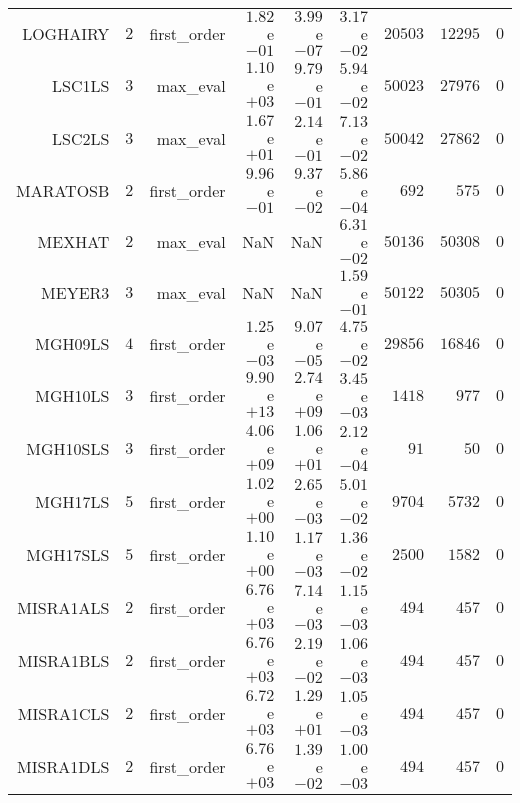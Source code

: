 \begin{longtable}{rrrrrrrrr}
LOGHAIRY & \(     2\) & first\_order & \( 1.82\)e\(-01\) & \( 3.99\)e\(-07\) & \( 3.17\)e\(-02\) & \( 20503\) & \( 12295\) & \(     0\) \\
LSC1LS & \(     3\) & max\_eval & \( 1.10\)e\(+03\) & \( 9.79\)e\(-01\) & \( 5.94\)e\(-02\) & \( 50023\) & \( 27976\) & \(     0\) \\
LSC2LS & \(     3\) & max\_eval & \( 1.67\)e\(+01\) & \( 2.14\)e\(-01\) & \( 7.13\)e\(-02\) & \( 50042\) & \( 27862\) & \(     0\) \\
MARATOSB & \(     2\) & first\_order & \( 9.96\)e\(-01\) & \( 9.37\)e\(-02\) & \( 5.86\)e\(-04\) & \(   692\) & \(   575\) & \(     0\) \\
MEXHAT & \(     2\) & max\_eval &       NaN &       NaN & \( 6.31\)e\(-02\) & \( 50136\) & \( 50308\) & \(     0\) \\
MEYER3 & \(     3\) & max\_eval &       NaN &       NaN & \( 1.59\)e\(-01\) & \( 50122\) & \( 50305\) & \(     0\) \\
MGH09LS & \(     4\) & first\_order & \( 1.25\)e\(-03\) & \( 9.07\)e\(-05\) & \( 4.75\)e\(-02\) & \( 29856\) & \( 16846\) & \(     0\) \\
MGH10LS & \(     3\) & first\_order & \( 9.90\)e\(+13\) & \( 2.74\)e\(+09\) & \( 3.45\)e\(-03\) & \(  1418\) & \(   977\) & \(     0\) \\
MGH10SLS & \(     3\) & first\_order & \( 4.06\)e\(+09\) & \( 1.06\)e\(+01\) & \( 2.12\)e\(-04\) & \(    91\) & \(    50\) & \(     0\) \\
MGH17LS & \(     5\) & first\_order & \( 1.02\)e\(+00\) & \( 2.65\)e\(-03\) & \( 5.01\)e\(-02\) & \(  9704\) & \(  5732\) & \(     0\) \\
MGH17SLS & \(     5\) & first\_order & \( 1.10\)e\(+00\) & \( 1.17\)e\(-03\) & \( 1.36\)e\(-02\) & \(  2500\) & \(  1582\) & \(     0\) \\
MISRA1ALS & \(     2\) & first\_order & \( 6.76\)e\(+03\) & \( 7.14\)e\(-03\) & \( 1.15\)e\(-03\) & \(   494\) & \(   457\) & \(     0\) \\
MISRA1BLS & \(     2\) & first\_order & \( 6.76\)e\(+03\) & \( 2.19\)e\(-02\) & \( 1.06\)e\(-03\) & \(   494\) & \(   457\) & \(     0\) \\
MISRA1CLS & \(     2\) & first\_order & \( 6.72\)e\(+03\) & \( 1.29\)e\(+01\) & \( 1.05\)e\(-03\) & \(   494\) & \(   457\) & \(     0\) \\
MISRA1DLS & \(     2\) & first\_order & \( 6.76\)e\(+03\) & \( 1.39\)e\(-02\) & \( 1.00\)e\(-03\) & \(   494\) & \(   457\) & \(     0\) \\

\end{longtable}
